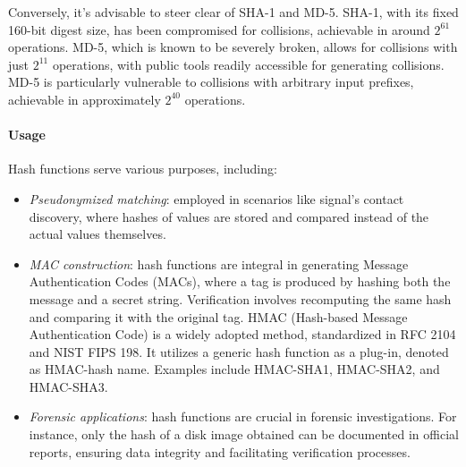 Conversely, it's advisable to steer clear of SHA-1 and MD-5. 
SHA-1, with its fixed 160-bit digest size, has been compromised for collisions, achievable in around $2^{61}$ operations. 
MD-5, which is known to be severely broken, allows for collisions with just $2^{11}$ operations, with public tools readily accessible for generating collisions. 
MD-5 is particularly vulnerable to collisions with arbitrary input prefixes, achievable in approximately $2^{40}$ operations.

\paragraph*{Usage}
Hash functions serve various purposes, including:
\begin{itemize}
    \item \textit{Pseudonymized matching}: employed in scenarios like signal's contact discovery, where hashes of values are stored and compared instead of the actual values themselves.
    \item \textit{MAC construction}: hash functions are integral in generating Message Authentication Codes (MACs), where a tag is produced by hashing both the message and a secret string. 
        Verification involves recomputing the same hash and comparing it with the original tag. 
        HMAC (Hash-based Message Authentication Code) is a widely adopted method, standardized in RFC 2104 and NIST FIPS 198. 
        It utilizes a generic hash function as a plug-in, denoted as HMAC-hash name. 
        Examples include HMAC-SHA1, HMAC-SHA2, and HMAC-SHA3.
    \item \textit{Forensic applications}: hash functions are crucial in forensic investigations. 
        For instance, only the hash of a disk image obtained can be documented in official reports, ensuring data integrity and facilitating verification processes.
\end{itemize}
